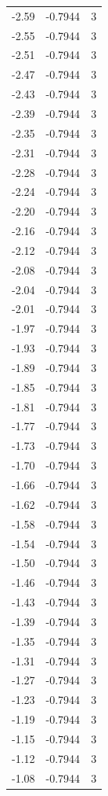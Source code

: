 \begin{longtable}{lrr}
  -2.59 & -0.7944 & 3 \\
  -2.55 & -0.7944 & 3 \\
  -2.51 & -0.7944 & 3 \\
  -2.47 & -0.7944 & 3 \\
  -2.43 & -0.7944 & 3 \\
  -2.39 & -0.7944 & 3 \\
  -2.35 & -0.7944 & 3 \\
  -2.31 & -0.7944 & 3 \\
  -2.28 & -0.7944 & 3 \\
  -2.24 & -0.7944 & 3 \\
  -2.20 & -0.7944 & 3 \\
  -2.16 & -0.7944 & 3 \\
  -2.12 & -0.7944 & 3 \\
  -2.08 & -0.7944 & 3 \\
  -2.04 & -0.7944 & 3 \\
  -2.01 & -0.7944 & 3 \\
  -1.97 & -0.7944 & 3 \\
  -1.93 & -0.7944 & 3 \\
  -1.89 & -0.7944 & 3 \\
  -1.85 & -0.7944 & 3 \\
  -1.81 & -0.7944 & 3 \\
  -1.77 & -0.7944 & 3 \\
  -1.73 & -0.7944 & 3 \\
  -1.70 & -0.7944 & 3 \\
  -1.66 & -0.7944 & 3 \\
  -1.62 & -0.7944 & 3 \\
  -1.58 & -0.7944 & 3 \\
  -1.54 & -0.7944 & 3 \\
  -1.50 & -0.7944 & 3 \\
  -1.46 & -0.7944 & 3 \\
  -1.43 & -0.7944 & 3 \\
  -1.39 & -0.7944 & 3 \\
  -1.35 & -0.7944 & 3 \\
  -1.31 & -0.7944 & 3 \\
  -1.27 & -0.7944 & 3 \\
  -1.23 & -0.7944 & 3 \\
  -1.19 & -0.7944 & 3 \\
  -1.15 & -0.7944 & 3 \\
  -1.12 & -0.7944 & 3 \\
  -1.08 & -0.7944 & 3 \\

\end{longtable}
